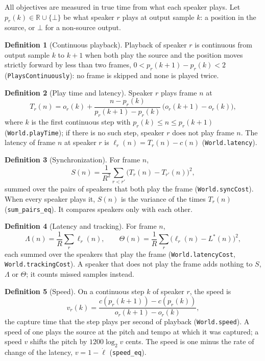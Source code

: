\documentclass[11pt,a4paper]{article}
\newcommand{\lean}[1]{\texttt{#1}}
\newcommand{\R}{\mathbb{R}}
\newcommand{\none}{\bot}
\theoremstyle{definition}
\newtheorem{definition}{Definition}[section]
\begin{document}
All objectives are measured in true time from what each speaker plays. Let
$p_r(k) \in \R \cup \{\none\}$ be what speaker $r$ plays at output sample
$k$: a position in the source, or $\none$ for a non-source output.

\begin{definition}[Continuous playback]
Playback of speaker $r$ is continuous from output sample $k$ to $k+1$ when
both play the source and the position moves strictly forward by less than
two frames, $0 < p_r(k+1) - p_r(k) < 2$ (\lean{PlaysContinuously}): no frame
is skipped and none is played twice.
\end{definition}

\begin{definition}[Play time and latency]
Speaker $r$ plays frame $n$ at
\[
  T_r(n) = o_r(k) + \frac{n - p_r(k)}{p_r(k+1) - p_r(k)}\,\bigl(o_r(k+1) - o_r(k)\bigr),
\]
where $k$ is the first continuous step with $p_r(k) \le n \le p_r(k+1)$
(\lean{World.playTime}); if there is no such step, speaker $r$ does not play
frame $n$. The latency of frame $n$ at speaker $r$ is
$\ell_r(n) = T_r(n) - c(n)$ (\lean{World.latency}).
\end{definition}

\begin{definition}[Synchronization]
For frame $n$,
\[
  S(n) = \frac{1}{R^2} \sum_{r < r'} \bigl(T_r(n) - T_{r'}(n)\bigr)^2,
\]
summed over the pairs of speakers that both play the frame
(\lean{World.syncCost}). When every speaker plays it, $S(n)$ is the
variance of the times $T_r(n)$ (\lean{sum\_pairs\_eq}). It compares speakers
only with each other.
\end{definition}

\begin{definition}[Latency and tracking]
For frame $n$,
\[
  \Lambda(n) = \frac{1}{R}\sum_r \ell_r(n),\qquad
  \Theta(n) = \frac{1}{R}\sum_r \bigl(\ell_r(n) - L^*(n)\bigr)^2,
\]
each summed over the speakers that play the frame (\lean{World.latencyCost},
\lean{World.trackingCost}). A speaker that does not play the frame adds
nothing to $S$, $\Lambda$ or $\Theta$; it counts missed samples instead.
\end{definition}

\begin{definition}[Speed]
On a continuous step $k$ of speaker $r$, the speed is
\[
  v_r(k) = \frac{c(p_r(k+1)) - c(p_r(k))}{o_r(k+1) - o_r(k)},
\]
the capture time that the step plays per second of playback
(\lean{World.speed}). A speed of one plays the source at the pitch and
tempo at which it was captured; a speed $v$ shifts the pitch by
$1200\log_2 v$ cents. The speed is one minus the rate of change of the
latency, $v = 1 - \dot\ell$ (\lean{speed\_eq}).
\end{definition}
\end{document}
